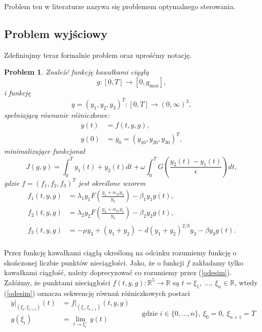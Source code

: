 \documentclass[11pt]{article}
\def\R{\mathbb{R}}
\newtheorem{problem}{Problem}
\begin{document}
Problem ten w literaturze nazywa się problemem optymalnego sterowania.

\subsection{Problem wyjściowy}
Zdefiniujmy teraz formalnie problem oraz uprośćmy notację.

\begin{problem}\label{problem}
  Znaleźć funkcję kawałkami ciągłą
  \[g: [0, T] \to [0, g_{\max}],\]
  i funkcję
  \[y = {(y_1, y_2, y_3)}^T: [0,T] \to {(0, \infty)}^3,\]
  spełniającą równanie różniczkowe:
  \begin{equation}\label{odesim}
    \begin{aligned}
      \dot{y}(t) &= f(t, y, g), \\
      y(0) &= y_0 = {(y_{10}, y_{20}, y_{30})}^T,
    \end{aligned}
  \end{equation}
  minimalizujące funkcjonał
  \begin{equation}\label{objfsim}
    J(g, y) = \int_0^T y_1(t) + y_2(t)dt + \omega\int_0^T G\left(\frac{y_2(t) - y_1(t)}{\epsilon}\right) dt,
  \end{equation}
  gdzie $f = {(f_1, f_2, f_3)}^T$ jest określone wzorem
  \begin{equation}\label{dynamicsim}
    \begin{aligned}
      f_1(t, y, g) &= \lambda_1y_1F\left(\frac{y_1 + \alpha_{12}y_2}{y_3}\right) - \beta_1y_1g(t), \\
      f_2(t, y, g) &= \lambda_2y_2F\left(\frac{y_2 + \alpha_{21}y_1}{y_3}\right) - \beta_2y_2g(t), \\
      f_3(t, y, g) &= -\mu y_3 + (y_1+y_2) - d{(y_1 + y_2)}^{2/3}y_3 - \beta y_3 g(t). \\
    \end{aligned}
  \end{equation}
\end{problem}

Przez funkcję kawałkami ciągłą określoną na odcinku rozumiemy funkcję o skończonej liczbie punktów nieciągłości. Jako, że o funkcji $f$ zakładamy tylko kawałkami ciągłość, należy doprecyzować co rozumiemy przez (\ref{odesim}). Załóżmy, że punktami nieciągłości $f(t,y,g): \R^5 \to \R$ są $t = \xi_1,\ \ldots,\ \xi_n \in \R$, wtedy (\ref{odesim}) oznacza sekwencję równań różniczkowych postaci
\begin{equation}\label{nonconode}
  \begin{aligned}
    \dot{y}|_{(\xi_i, \xi_{i+1})}(t) &= f|_{(\xi_i, \xi_{i+1})}(t, y, g)\\
    y(\xi_i) &= \lim_{t\to \xi_i^-}y(t)
  \end{aligned}
  \quad \text{ gdzie } i \in \{0,\ldots, n\},\ \xi_0 = 0,\ \xi_{n+1}=T
\end{equation}
\end{document}
